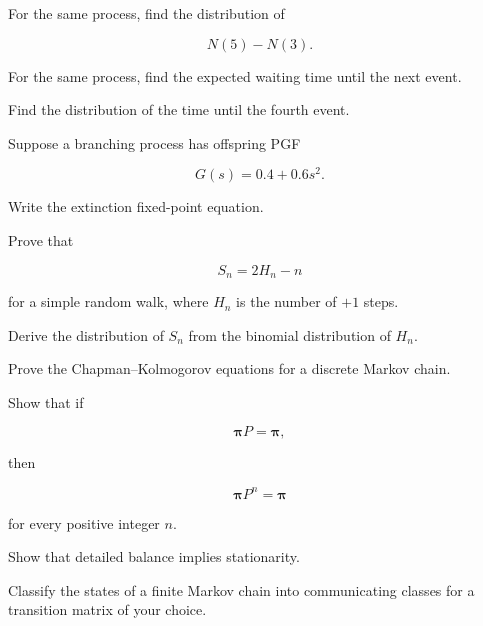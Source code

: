 \begin{exercise}[2]
For the same process, find the distribution of

\[
N(5)-N(3).
\]
\end{exercise}

\begin{exercise}[2]
For the same process, find the expected waiting time until the next
event.
\end{exercise}

\begin{exercise}[2]
Find the distribution of the time until the fourth event.
\end{exercise}

\begin{exercise}[2]
Suppose a branching process has offspring PGF

\[
G(s)=0.4+0.6s^2.
\]

Write the extinction fixed-point equation.
\end{exercise}

\begin{exercise}[3]
Prove that

\[
S_n=2H_n-n
\]

for a simple random walk, where \(H_n\) is the number of \(+1\) steps.
\end{exercise}

\begin{exercise}[3]
Derive the distribution of \(S_n\) from the binomial distribution of
\(H_n\).
\end{exercise}

\begin{exercise}[3]
Prove the Chapman--Kolmogorov equations for a discrete Markov chain.
\end{exercise}

\begin{exercise}[3]
Show that if

\[
\boldsymbol{\pi}P=\boldsymbol{\pi},
\]

then

\[
\boldsymbol{\pi}P^n=\boldsymbol{\pi}
\]

for every positive integer \(n\).
\end{exercise}

\begin{exercise}[3]
Show that detailed balance implies stationarity.
\end{exercise}

\begin{exercise}[3]
Classify the states of a finite Markov chain into communicating classes
for a transition matrix of your choice.
\end{exercise}

